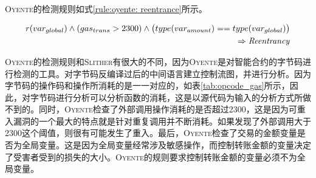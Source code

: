 \textsc{Oyente}的检测规则如式\ref{rule:oyente: reentrance}所示。
\begin{mdframed}[
	linewidth = 1pt,
	innertopmargin = -5pt,
	innerbottommargin = 3pt,
	outerlinewidth = 1pt
	]
    \small
	\begin{equation} \label{rule:oyente: reentrance}
    \begin{split}
       r(var_{global}) \wedge (gas_{trans} > 2300) \wedge \big (type(var_{amount}) == type(var_{global})\big )  \\
       \Rightarrow \text{\emph{Reentrancy}}
    \end{split}
	\end{equation}
\end{mdframed}
\textsc{Oyente}的检测规则和\textsc{Slither}有很大的不同，因为\textsc{Oyente}是对智能合约的字节码进行检测的工具。对字节码反编译过后的中间语言建立控制流图，并进行分析。因为字节码的操作码和操作所消耗的是一一对应的，如表\ref{tab:opcode_gas}所示，因此，对字节码进行分析可以分析函数的消耗，这是以源代码为输入的分析方式所做不到的。同时，\textsc{Oyente}检查了外部调用操作消耗的是否超过2300，这是因为可重入漏洞的一个最大的特点就是针对重复调用并不断消耗。如果发现了外部调用大于2300这个阈值，则很有可能发生了重入。最后，\textsc{Oyente}检查了交易的金额变量是否为全局变量。这是因为全局变量经常涉及敏感操作，而控制转账金额的变量决定了受害者受到的损失的大小。\textsc{Oyente}的规则要求控制转账金额的变量必须不为全局变量。

